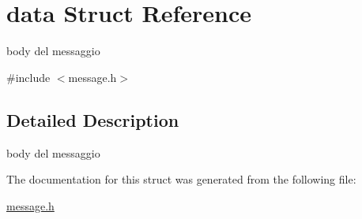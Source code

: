 \hypertarget{structdata}{}\section{data Struct Reference}
\label{structdata}


body del messaggio  




{\ttfamily \#include $<$message.\+h$>$}



\subsection{Detailed Description}
body del messaggio 

The documentation for this struct was generated from the following file\+:\begin{DoxyCompactItemize}
\item 
\hyperlink{message_8h}{message.\+h}\end{DoxyCompactItemize}
